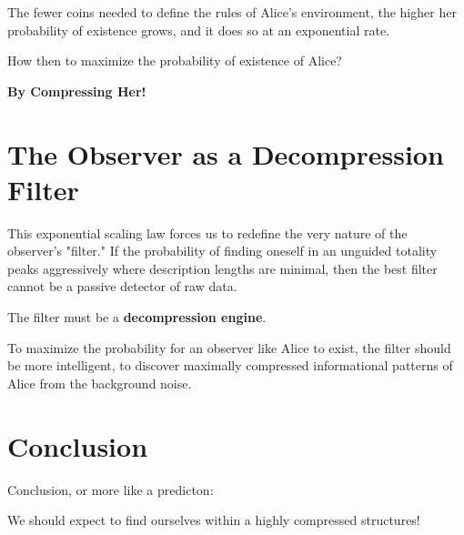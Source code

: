 The fewer coins needed to define the rules of Alice's environment, the higher her probability of existence grows, and it does so at an exponential rate. 


How then to maximize the probability of existence of Alice? 

\textbf{By Compressing Her!}



\section{The Observer as a Decompression Filter}

This exponential scaling law forces us to redefine the very nature of the observer's "filter."
If the probability of finding oneself in an unguided totality peaks aggressively where description lengths are minimal, then the best filter cannot be a passive detector of raw data. 

The filter must be a \textbf{decompression engine}.

To maximize the probability for an observer like Alice to exist, the filter should be more intelligent, to discover maximally compressed informational
patterns of Alice from the background noise. 


\section{Conclusion}

Conclusion, or more like a predicton:

We should expect to find ourselves within a highly compressed structures!

